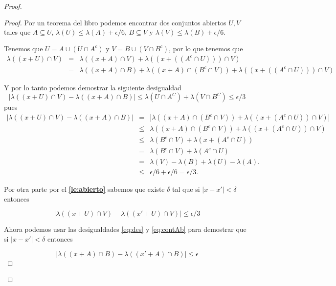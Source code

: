 \documentclass[letter,twoside,12pt]{article}
\numberwithin{equation}{section}
\begin{document}
\begin{proof}
\begin{proof}
Por un teorema del libro \cite[Teorema 9.24]{hewitt} podemos encontrar dos conjuntos abiertos $U, V$ tales que $ A \subseteq U $, $\lambda(U) \leq \lambda(A)+\epsilon/6$, $ B \subseteq V $ y $\lambda(V) \leq \lambda(B)+\epsilon/6$.

Tenemos que $ U = A \cup (U \cap A^c)$ y $ V = B \cup (V \cap B^c)$, por lo que tenemos que
\begin{eqnarray*}
\lambda((x+U) \cap V) &=& \lambda((x+A) \cap V) + \lambda((x+((A^c \cap U))) \cap V)
\\&=& \lambda((x+A) \cap B) + \lambda((x+A) \cap (B^c \cap V)) + \lambda((x+((A^c \cap U))) \cap V)
\end{eqnarray*}

Y por lo tanto podemos demostrar la siguiente desigualdad
\begin{equation}
|\lambda((x+U) \cap V) - \lambda((x+A) \cap B)| \leq \lambda(U \cap A^C) + \lambda(V \cap B^C) \leq \epsilon/3 \label{eq:des}
\end{equation}
pues
\begin{eqnarray*}
|\lambda((x+U) \cap V) - \lambda((x+A) \cap B)| & = & |\lambda((x+A) \cap (B^c \cap V)) + \lambda((x+(A^c \cap U)) \cap V)|
\\&\leq & \lambda((x+A) \cap (B^c \cap V)) + \lambda((x+(A^c \cap U)) \cap V)
\\&\leq & \lambda(B^c \cap V) + \lambda(x+(A^c \cap U))
\\&= & \lambda(B^c \cap V) + \lambda(A^c \cap U)
\\&= & \lambda(V) - \lambda(B)  + \lambda(U) - \lambda(A).
\\& \leq & \epsilon/6  + \epsilon/6 = \epsilon/3.
\end{eqnarray*}

Por otra parte por el \textbf{\autoref{le:abierto}} sabemos que existe $\delta $ tal que si $|x-x'| < \delta $ entonces 

\begin{equation}
|\lambda((x+U) \cap V)- \lambda((x'+U) \cap V)| \leq \epsilon/3 \label{eq:contAb} 
\end{equation}

Ahora podemos usar las desigualdades \eqref{eq:des} y \eqref{eq:contAb} para demostrar que si $|x-x'|<\delta $ entonces 

\begin{equation*}
|\lambda((x+A) \cap B)- \lambda((x'+A) \cap B)| \leq \epsilon
\end{equation*}


\end{proof}
\end{proof}
\end{document}
